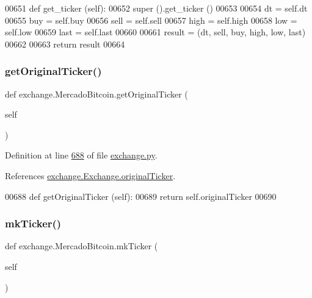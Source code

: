 \begin{DoxyCode}
00651     \textcolor{keyword}{def }get\_ticker (self):
00652         super ().get\_ticker ()
00653         
00654         dt   = self.dt
00655         buy  = self.buy
00656         sell = self.sell
00657         high = self.high
00658         low  = self.low
00659         last = self.last
00660         
00661         result = (dt, sell, buy, high, low, last)
00662         
00663         \textcolor{keywordflow}{return} result
00664     
\end{DoxyCode}
\mbox{\label{classexchange_1_1_mercado_bitcoin_a1f65e187370684cf17076eb8d0e126d2}} 
\subsubsection{\texorpdfstring{get\+Original\+Ticker()}{getOriginalTicker()}}
{\footnotesize\ttfamily def exchange.\+Mercado\+Bitcoin.\+get\+Original\+Ticker (\begin{DoxyParamCaption}\item[{}]{self }\end{DoxyParamCaption})}



Definition at line \hyperlink{exchange_8py_source_l00688}{688} of file \hyperlink{exchange_8py_source}{exchange.\+py}.



References \hyperlink{exchange_8py_source_l00186}{exchange.\+Exchange.\+original\+Ticker}.


\begin{DoxyCode}
00688     \textcolor{keyword}{def }getOriginalTicker (self):
00689         \textcolor{keywordflow}{return} self.originalTicker
00690         
\end{DoxyCode}
\mbox{\label{classexchange_1_1_mercado_bitcoin_a9aca0ea07eeeeb5ef2b5d5e108b45435}} 
\subsubsection{\texorpdfstring{mk\+Ticker()}{mkTicker()}}
{\footnotesize\ttfamily def exchange.\+Mercado\+Bitcoin.\+mk\+Ticker (\begin{DoxyParamCaption}\item[{}]{self }\end{DoxyParamCaption})}



